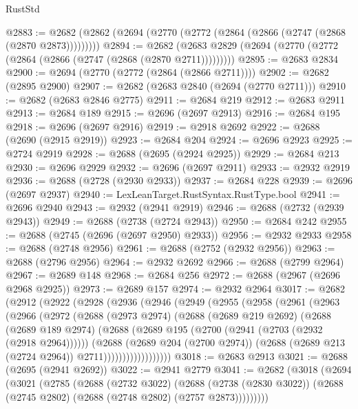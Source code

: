 \begin{lexlean}{RustStd}
\begin{coremodule}
{\begin{coremodule}
{{{{{{{{{{{{{{{{{{{{{{{{{@2883 := @2682 (@2862 (@2694 (@2770 (@2772 (@2864 (@2866 (@2747 (@2868 (@2870 @2873)))))))))
@2894 := @2682 (@2683 @2829 (@2694 (@2770 (@2772 (@2864 (@2866 (@2747 (@2868 (@2870 @2711)))))))))
@2895 := @2683 @2834
@2900 := @2694 (@2770 (@2772 (@2864 (@2866 @2711))))
@2902 := @2682 (@2895 @2900)
@2907 := @2682 (@2683 @2840 (@2694 (@2770 @2711)))
@2910 := @2682 (@2683 @2846 @2775)
@2911 := @2684 @219
@2912 := @2683 @2911
@2913 := @2684 @189
@2915 := @2696 (@2697 @2913)
@2916 := @2684 @195
@2918 := @2696 (@2697 @2916)
@2919 := @2918 @2692
@2922 := @2688 (@2690 (@2915 @2919))
@2923 := @2684 @204
@2924 := @2696 @2923
@2925 := @2724 @2919
@2928 := @2688 (@2695 (@2924 @2925))
@2929 := @2684 @213
@2930 := @2696 @2929
@2932 := @2696 (@2697 @2911)
@2933 := @2932 @2919
@2936 := @2688 (@2728 (@2930 @2933))
@2937 := @2684 @228
@2939 := @2696 (@2697 @2937)
@2940 := LexLeanTarget.RustSyntax.RustType.bool
@2941 := @2696 @2940
@2943 := @2932 (@2941 @2919)
@2946 := @2688 (@2732 (@2939 @2943))
@2949 := @2688 (@2738 (@2724 @2943))
@2950 := @2684 @242
@2955 := @2688 (@2745 (@2696 (@2697 @2950) @2933))
@2956 := @2932 @2933
@2958 := @2688 (@2748 @2956)
@2961 := @2688 (@2752 (@2932 @2956))
@2963 := @2688 (@2796 @2956)
@2964 := @2932 @2692
@2966 := @2688 (@2799 @2964)
@2967 := @2689 @148
@2968 := @2684 @256
@2972 := @2688 (@2967 (@2696 @2968 @2925))
@2973 := @2689 @157
@2974 := @2932 @2964
@3017 := @2682
    (@2912
      (@2922
        (@2928
          (@2936
            (@2946
              (@2949
                (@2955
                  (@2958
                    (@2961
                      (@2963
                        (@2966
                          (@2972
                            (@2688
                              (@2973 @2974)
                              (@2688
                                (@2689 @219 @2692)
                                (@2688
                                  (@2689 @189 @2974)
                                  (@2688
                                    (@2689 @195 (@2700 (@2941 (@2703 (@2932 (@2918 @2964))))))
                                    (@2688
                                      (@2689 @204 (@2700 @2974))
                                      (@2688 (@2689 @213 (@2724 @2964)) @2711))))))))))))))))))
@3018 := @2683 @2913
@3021 := @2688 (@2695 (@2941 @2692))
@3022 := @2941 @2779
@3041 := @2682
    (@3018
      (@2694
        (@3021
          (@2785
            (@2688
              (@2732 @3022)
              (@2688
                (@2738 (@2830 @3022))
                (@2688 (@2745 @2802) (@2688 (@2748 @2802) (@2757 @2873)))))))))
}}}}}}}}}}}}}}}}}}}}}}}}}
\end{coremodule}}
\end{coremodule}
\end{lexlean}
